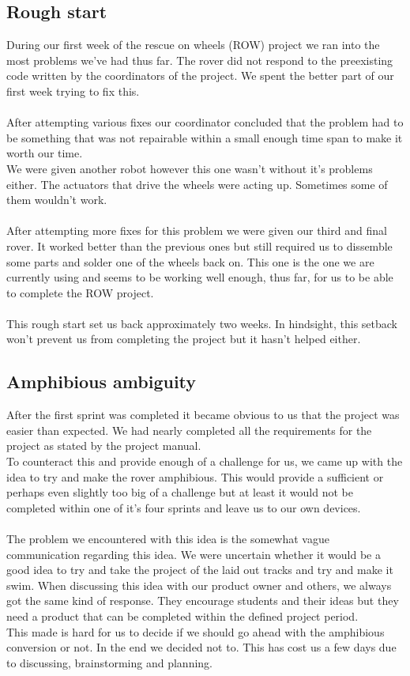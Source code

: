 \documentclass[12pt]{article}
\begin{document}
	\subsection{Rough start}
	During our first week of the rescue on wheels (ROW) project we ran into the most problems we've had thus far. The rover did not respond to the preexisting code written by the coordinators of the project. We spent the better part of our first week trying to fix this.\\ 
	\\After attempting various fixes our coordinator concluded that the problem had to be something that was not repairable within a small enough time span to make it worth our time.\\ 
	We were given another robot however this one wasn't without it's problems either. The actuators that drive the wheels were acting up. Sometimes some of them wouldn't work.\\
	\\After attempting more fixes for this problem we were given our third and final rover. It worked better than the previous ones but still required us to dissemble some parts and solder one of the wheels back on. This one is the one we are currently using and seems to be working well enough, thus far, for us to be able to complete the ROW project.\\
	\\This rough start set us back approximately two weeks. In hindsight, this setback won't prevent us from completing the project but it hasn't helped either. 
	\subsection{Amphibious ambiguity}
	After the first sprint was completed it became obvious to us that the project was easier than expected. We had nearly completed all the requirements for the project as stated by the project manual.\\
	To counteract this and provide enough of a challenge for us, we came up with the idea to try and make the rover amphibious. This would provide a sufficient or perhaps even slightly too big of a challenge but at least it would not be completed within one of it's four sprints and leave us to our own devices.\\
	\\The problem we encountered with this idea is the somewhat vague communication regarding this idea. We were uncertain whether it would be a good idea to try and take the project of the laid out tracks and try and make it swim. When discussing this idea with our product owner and others, we always got the same kind of response. They encourage students and their ideas but they need a product that can be completed within the defined project period.\\
	This made is hard for us to decide if we should go ahead with the amphibious conversion or not. In the end we decided not to. This has cost us a few days due to discussing, brainstorming and planning.
\end{document}
